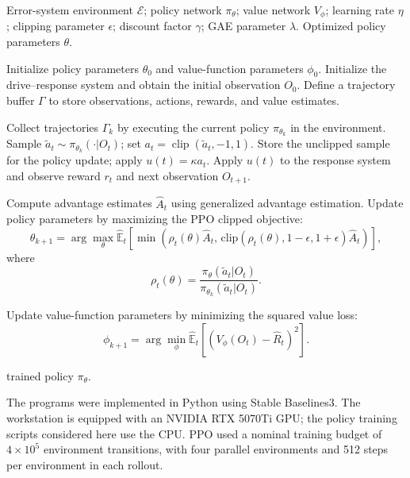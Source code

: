 \documentclass[a4paper,fleqn]{cas-sc}
\theoremstyle{plain}
\theoremstyle{definition}
\begin{document}
\begin{algorithm}[t]
	\caption{PPO-based Single-Input Pinning Control for the Error System}
	\label{alg:ppo_pinning}
	\begin{algorithmic}[1]
		\Require Error-system environment $\mathcal{E}$; policy network $\pi_{\theta}$; value network $V_{\phi}$; learning rate $\eta$; clipping parameter $\epsilon$; discount factor $\gamma$; GAE parameter $\lambda$.
		\Ensure Optimized policy parameters $\theta$.
		
		\State Initialize policy parameters $\theta_0$ and value-function parameters $\phi_0$.
		\State Initialize the drive--response system and obtain the initial observation $O_0$.
		\State Define a trajectory buffer $\Gamma$ to store observations, actions, rewards, and value estimates.
		
		\State Collect trajectories $\Gamma_k$ by executing the current policy $\pi_{\theta_k}$ in the environment.
		\State Sample $\widetilde a_t \sim \pi_{\theta_k}(\cdot|O_t)$; set $a_t=\operatorname{clip}(\widetilde a_t,-1,1)$.
		\State Store the unclipped sample for the policy update; apply $u(t)=\kappa a_t$.
		\State Apply $u(t)$ to the response system and observe reward $r_t$ and next observation $O_{t+1}$.
		\EndFor
		
		\State Compute advantage estimates $\hat{A}_t$ using generalized advantage estimation.
		\State Update policy parameters by maximizing the PPO clipped objective:
		\Statex
		\[
		\theta_{k+1}
		=
		\arg\max_{\theta}
		\hat{\mathbb{E}}_t
		\left[
		\min
		\left(
		\rho_t(\theta)\hat{A}_t,\,
		\mathrm{clip}\left(\rho_t(\theta),1-\epsilon,1+\epsilon\right)\hat{A}_t
		\right)
		\right],
		\]
		\Statex
		where
		\[
		\rho_t(\theta)
		=\frac{\pi_{\theta}(\widetilde a_t|O_t)}
		{\pi_{\theta_k}(\widetilde a_t|O_t)}.
		\]
		
		\State Update value-function parameters by minimizing the squared value loss:
		\Statex
		\[
		\phi_{k+1}
		=
		\arg\min_{\phi}
		\hat{\mathbb{E}}_t
		\left[
		\left(
		V_{\phi}(O_t)-\hat{R}_t
		\right)^2
		\right].
		\]
		\EndFor
		
		\State \Return trained policy $\pi_{\theta}$.
	\end{algorithmic}
\end{algorithm}

The programs were implemented in Python using Stable Baselines3. The workstation is equipped with an NVIDIA RTX 5070Ti GPU; the policy training scripts considered here use the CPU. PPO used a nominal training budget of $4\times10^5$ environment transitions, with four parallel environments and 512 steps per environment in each rollout.
\end{document}
